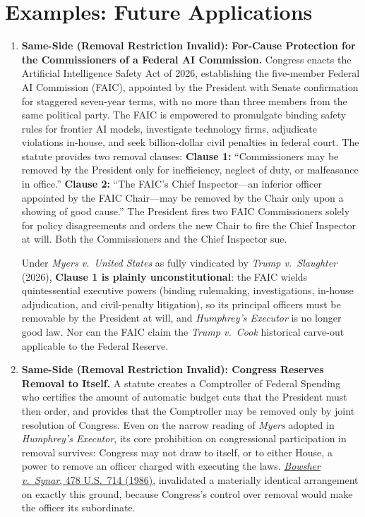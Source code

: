 \documentclass[12pt]{article}
\begin{document}
\section{Examples: Future Applications}
\begin{enumerate}

\item \textbf{Same-Side (Removal Restriction Invalid): For-Cause Protection for the Commissioners of a Federal AI Commission.} Congress enacts the Artificial Intelligence Safety Act of 2026, establishing the five-member Federal AI Commission (FAIC), appointed by the President with Senate confirmation for staggered seven-year terms, with no more than three members from the same political party. The FAIC is empowered to promulgate binding safety rules for frontier AI models, investigate technology firms, adjudicate violations in-house, and seek billion-dollar civil penalties in federal court. The statute provides two removal clauses: \textbf{Clause 1:} ``Commissioners may be removed by the President only for inefficiency, neglect of duty, or malfeasance in office.'' \textbf{Clause 2:} ``The FAIC's Chief Inspector---an inferior officer appointed by the FAIC Chair---may be removed by the Chair only upon a showing of good cause.'' The President fires two FAIC Commissioners solely for policy disagreements and orders the new Chair to fire the Chief Inspector at will. Both the Commissioners and the Chief Inspector sue.

Under \textit{Myers v.\ United States} as fully vindicated by \textit{Trump v.\ Slaughter} (2026), \textbf{Clause 1 is plainly unconstitutional}: the FAIC wields quintessential executive powers (binding rulemaking, investigations, in-house adjudication, and civil-penalty litigation), so its principal officers must be removable by the President at will, and \textit{Humphrey's Executor} is no longer good law. Nor can the FAIC claim the \textit{Trump v.\ Cook} historical carve-out applicable to the Federal Reserve.

\item \textbf{Same-Side (Removal Restriction Invalid): Congress Reserves Removal to Itself.} A statute creates a Comptroller of Federal Spending who certifies the amount of automatic budget cuts that the President must then order, and provides that the Comptroller may be removed only by joint resolution of Congress. Even on the narrow reading of \textit{Myers} adopted in \textit{Humphrey's Executor}, its core prohibition on congressional participation in removal survives: Congress may not draw to itself, or to either House, a power to remove an officer charged with executing the laws. \href{https://supreme.justia.com/cases/federal/us/478/714/}{\textit{Bowsher v.\ Synar}, 478 U.S.\ 714 (1986)}, invalidated a materially identical arrangement on exactly this ground, because Congress's control over removal would make the officer its subordinate.


\end{enumerate}
\end{document}
